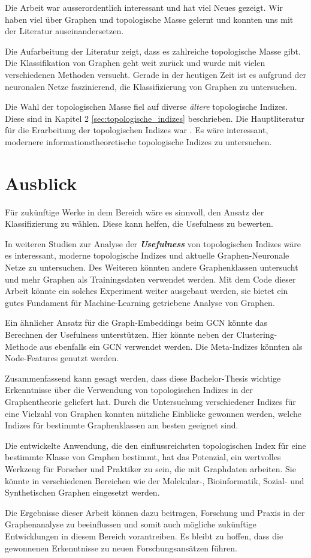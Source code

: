 Die Arbeit war ausserordentlich interessant und hat viel Neues gezeigt.
Wir haben viel über Graphen und topologische Masse gelernt und konnten uns mit der Literatur auseinandersetzen.

Die Aufarbeitung der Literatur zeigt, dass es zahlreiche topologische Masse gibt.
Die Klassifikation von Graphen geht weit zurück und wurde mit vielen verschiedenen Methoden versucht.
Gerade in der heutigen Zeit ist es aufgrund der neuronalen Netze faszinierend, die Klassifizierung von Graphen zu untersuchen.

Die Wahl der topologischen Masse fiel auf diverse \emph{ältere} topologische Indizes. Diese sind in Kapitel 2 \ref{sec:topologische_indizes} beschrieben. 
Die Hauptliteratur für die Erarbeitung der topologischen Indizes war \cite{balaban_1983_2014}.
Es wäre interessant, modernere informationstheoretische topologische Indizes zu untersuchen.

\section{Ausblick}

Für zukünftige Werke in dem Bereich wäre es sinnvoll, den Ansatz der Klassifizierung zu wählen.
Diese kann helfen, die Usefulness zu bewerten.

In weiteren Studien zur Analyse der \textbf{\textit{Usefulness}} von topologischen Indizes wäre es interessant, moderne topologische Indizes und aktuelle Graphen-Neuronale Netze zu untersuchen.
Des Weiteren könnten andere Graphenklassen untersucht und mehr Graphen als Trainingsdaten verwendet werden.
Mit dem Code dieser Arbeit könnte ein solches Experiment weiter ausgebaut werden, sie bietet ein gutes Fundament für Machine-Learning getriebene Analyse von Graphen.

Ein ähnlicher Ansatz für die Graph-Embeddings beim GCN könnte das Berechnen der Usefulness unterstützen.
Hier könnte neben der Clustering-Methode aus \cite{ma_usefulness_2022} ebenfalls ein GCN verwendet werden.
Die Meta-Indizes könnten als Node-Features genutzt werden.

Zusammenfassend kann gesagt werden, dass diese Bachelor-Thesis wichtige Erkenntnisse über die Verwendung von topologischen Indizes in der Graphentheorie geliefert hat.
Durch die Untersuchung verschiedener Indizes für eine Vielzahl von Graphen konnten nützliche Einblicke gewonnen werden, welche Indizes für bestimmte Graphenklassen am besten geeignet sind.

Die entwickelte Anwendung, die den einflussreichsten topologischen Index für eine bestimmte Klasse von Graphen bestimmt, hat das Potenzial, ein wertvolles Werkzeug für Forscher und Praktiker zu sein, die mit Graphdaten arbeiten.
Sie könnte in verschiedenen Bereichen wie der Molekular-, Bioinformatik, Sozial- und Synthetischen Graphen eingesetzt werden.

Die Ergebnisse dieser Arbeit können dazu beitragen, Forschung und Praxis in der Graphenanalyse zu beeinflussen und somit auch mögliche zukünftige Entwicklungen in diesem Bereich vorantreiben.
Es bleibt zu hoffen, dass die gewonnenen Erkenntnisse zu neuen Forschungsansätzen führen.
